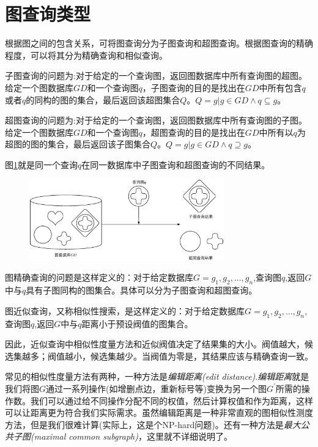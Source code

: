 \documentclass{XDBAthesis}
\begin{document}
\section{图查询类型}
根据图之间的包含关系，可将图查询分为子图查询和超图查询。根据图查询的精确程度，可以将其分为精确查询和相似查询。
\begin{defn}
子图查询的问题为:对于给定的一个查询图，返回图数据库中所有查询图的超图。给定一个图数据库$GD$和一个查询图$q$，子图查询的目的是找出在$GD$中所有包含$q$或者$q$的同构的图的集合，最后返回该超图集合$Q$。$Q={g|g\in GD\wedge q\subseteq g}$。
\end{defn}
\begin{defn}
超图查询的问题为:对于给定的一个查询图，返回图数据库中所有查询图的子图。给定一个图数据库$GD$和一个查询图$q$，超图查询的目的是找出在$GD$中所有以$q$为超图的图的集合，最后返回该子图集合$Q$。$Q={g|g\in GD\wedge q\supseteq g}$。    
\end{defn}

图\ref{fg:subsup}就是同一个查询$q$在同一数据库中子图查询和超图查询的不同结果。

\begin{figure}
    \centering
    \includegraphics[width=0.75\textwidth]{Database.eps}
    \label{fg:subsup}
\end{figure}

\begin{defn}[精确查询]
图精确查询的问题是这样定义的：对于给定数据库$G={g_1 ,g_2 ,...,g_n }$,查询图$q$,返回$G$中与$q$具有子图同构的图集合。具体可以分为子图查询和超图查询。
\end{defn}
\begin{defn}[近似查询]
图近似查询，又称相似性搜索，是这样定义的：对于给定数据库$G={g_1 ,g_2 ,...,g_n }$,查询图$q$,返回$G$中与$q$距离小于预设阀值的图集合。
\end{defn}

因此，近似查询中相似性度量方法和近似阀值决定了结果集的大小。阀值越大，候选集越多；阀值越小，候选集越少。当阀值为零是，其结果应该与精确查询一致。

常见的相似性度量方法有两种，一种方法是\emph{编辑距离(edit distance)}.\emph{编辑距离}就是我们将图$G$通过一系列操作(如增删点边，重新标号等)变换为另一个图$G^{'}$所需的操作数。我们可以通过给不同操作分配不同的权值，然后计算权值和作为距离，这样可以让距离更为符合我们实际需求。虽然编辑距离是一种非常直观的图相似性测度方法，但是我们很难计算(实际上，这是个NP-hard问题)。还有一种方法是\emph{最大公共子图(maximal common subgraph)}\cite{mcs}，这里就不详细说明了。

\ifx\allfiles\undefined


\end{document}

